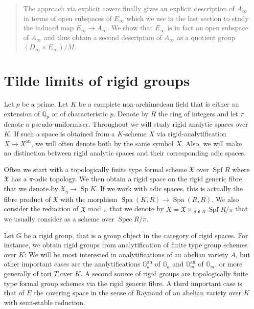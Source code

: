 \documentclass[11pt,oneside]{amsart}
\theoremstyle{definition}
\theoremstyle{remark}
\begin{document}
\begin{abstract}
		The approach via explicit covers finally gives an explicit description of $A_\infty$ in terms of open subspaces of $E_\infty$ which we use in the last section to study the induced map $E_\infty\rightarrow A_\infty$. We show that $E_\infty$ is in fact an open subspace of $A_\infty$ and thus obtain a second description of $A_\infty$ as a quotient group $(D_\infty\times E_\infty)/M$.
		
	\end{abstract}
	
	\pagebreak
	\tableofcontents
	\section{Tilde limits of rigid groups}
	
	Let $p$ be a prime. Let $K$ be a complete non-archimedean field that is either an extension of $\mathbb Q_p$ or of characteristic $p$. Denote by $R$ the ring of integers and let $\pi$ denote a pseudo-uniformiser. Throughout we will study rigid analytic spaces over $K$. If such a space is obtained from a $K$-scheme $X$ via rigid-analytification $X\mapsto X^{\operatorname{an}}$, we will often denote both by the same symbol $X$. Also, we will make no distinction between rigid analytic spaces and their corresponding adic spaces.
	
	Often we start with a topologically finite type formal scheme $\mathfrak X$ over $\operatorname{Spf} R$ where $\mathfrak X$ has a $\pi$-adic topology. We then obtain a rigid space on the rigid generic fibre that we denote by $\mathfrak X_\eta \rightarrow \operatorname {Sp} K$. If we work with adic spaces, this is actually the fibre product of $\mathfrak X$ with the morphism $\operatorname{Spa}(K,R)\rightarrow \operatorname{Spa}(R,R)$. We also consider the reduction of $\mathfrak X$ mod $\pi$ that we denote by $\tilde{X}=\mathfrak X\times_{\operatorname{Spf}R}\operatorname{Spf}R/\pi$ that we usually consider as a scheme over $\operatorname{Spec}R/\pi$.

	Let $G$ be a rigid group, that is a group object in the category of rigid spaces. For instance, we obtain rigid groups from analytification of finite type group schemes over $K$: We will be most interested in analytifications of an abelian variety $A$, but other important cases are the analytifications  $\mathbb G_a^{\operatorname{an}}$ of $\mathbb G_a$ and $\mathbb G_m^{\operatorname{an}}$ of $\mathbb G_m$, or more generally of tori $T$ over $K$. A second source of rigid groups are topologically finite type formal group schemes via the rigid generic fibre. A third important case is that of $E$ the covering space in the sense of Raynaud of an abelian variety over $K$ with semi-stable reduction.
	
\end{document}
